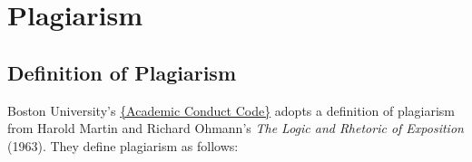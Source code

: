 

\chapter{Plagiarism}

\section{Definition of Plagiarism}

Boston University's
\href{http://www.bu.edu/academics/resources/academic-conduct-code/}{\{Academic
Conduct Code\}} adopts a definition of plagiarism from Harold Martin and Richard
Ohmann's \emph{The Logic and Rhetoric of Exposition} (1963). They define plagiarism
as follows:

